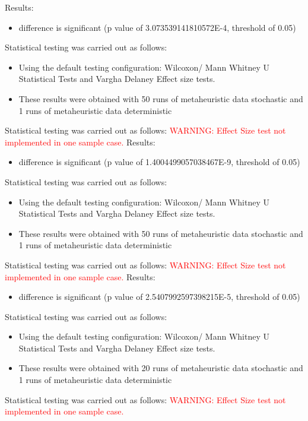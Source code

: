 \documentclass[]{article}
\begin{document}
Results:
\begin{itemize}
\item{difference is significant (p value of 3.073539141810572E-4, threshold of 0.05)}
\end{itemize}Statistical testing was carried out as follows: \begin{itemize}
\item{Using the default testing configuration: Wilcoxon/ Mann Whitney U Statistical Tests and Vargha Delaney Effect size tests.}
\item{These results were obtained with 50 runs of metaheuristic data stochastic and 1 runs of metaheuristic data deterministic}
\end{itemize}Statistical testing was carried out as follows: 
\textcolor{Red}{WARNING: Effect Size test not implemented in one sample case.
}
Results:
\begin{itemize}
\item{difference is significant (p value of 1.4004499057038467E-9, threshold of 0.05)}
\end{itemize}Statistical testing was carried out as follows: \begin{itemize}
\item{Using the default testing configuration: Wilcoxon/ Mann Whitney U Statistical Tests and Vargha Delaney Effect size tests.}
\item{These results were obtained with 50 runs of metaheuristic data stochastic and 1 runs of metaheuristic data deterministic}
\end{itemize}Statistical testing was carried out as follows: 
\textcolor{Red}{WARNING: Effect Size test not implemented in one sample case.
}
Results:
\begin{itemize}
\item{difference is significant (p value of 2.5407992597398215E-5, threshold of 0.05)}
\end{itemize}Statistical testing was carried out as follows: \begin{itemize}
\item{Using the default testing configuration: Wilcoxon/ Mann Whitney U Statistical Tests and Vargha Delaney Effect size tests.}
\item{These results were obtained with 20 runs of metaheuristic data stochastic and 1 runs of metaheuristic data deterministic}
\end{itemize}Statistical testing was carried out as follows: 
\textcolor{Red}{WARNING: Effect Size test not implemented in one sample case.
}
\end{document}
